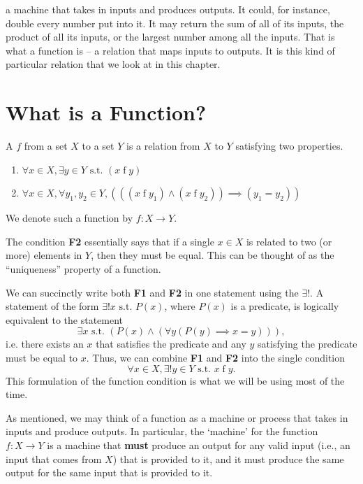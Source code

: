  a machine that takes in inputs and produces outputs. It could, for instance, double every number put into it. It may return the sum of all of its inputs, the product of all its inputs, or the largest number among all the inputs. That is what a function is -- a relation that maps inputs to outputs. It is this kind of particular relation that we look at in this chapter.

\section{What is a Function?}
\begin{definition}[Function]\label{definition:function}
    A  $f$ from a set $X$ to a set $Y$ is a relation from $X$ to $Y$ satisfying two properties.
    \begin{enumerate}[label=\textbf{F\arabic*.},leftmargin=1.35\parindent]
        \item $\forall x \in X, \exists y \in Y \text{ s.t. } (x \mathrel{f} y)$
        \item $\forall x \in X, \forall y_1, y_2 \in Y, (((x \mathrel{f} y_1) \land (x \mathrel{f} y_2)) \implies (y_1 = y_2))$
    \end{enumerate}
    We denote such a function by $f: X \to Y$.
\end{definition}

The condition \textbf{F2} essentially says that if a single $x \in X$ is related to two (or more) elements in $Y$, then they must be equal. This can be thought of as the ``uniqueness'' property of a function.

We can succinctly write both \textbf{F1} and \textbf{F2} in one statement using the  $\exists!$. A statement of the form $\exists! x \text{ s.t. } P(x)$, where $P(x)$ is a predicate, is logically equivalent to the statement
\[
    \exists x \text{ s.t. } (P(x) \land (\forall y (P(y) \implies x = y))),
\]
i.e. there exists an $x$ that satisfies the predicate and any $y$ satisfying the predicate must be equal to $x$. Thus, we can combine \textbf{F1} and \textbf{F2} into the single condition
\[
    \forall x \in X, \exists! y \in Y \text{ s.t. } x \mathrel{f} y.
\]
This formulation of the function condition is what we will be using most of the time.

As mentioned, we may think of a function as a machine or process that takes in inputs and produce outputs. In particular, the `machine' for the function $f: X \to Y$ is a machine that \textbf{must} produce an output for any valid input (i.e., an input that comes from $X$) that is provided to it, and it must produce the same output for the same input that is provided to it.

